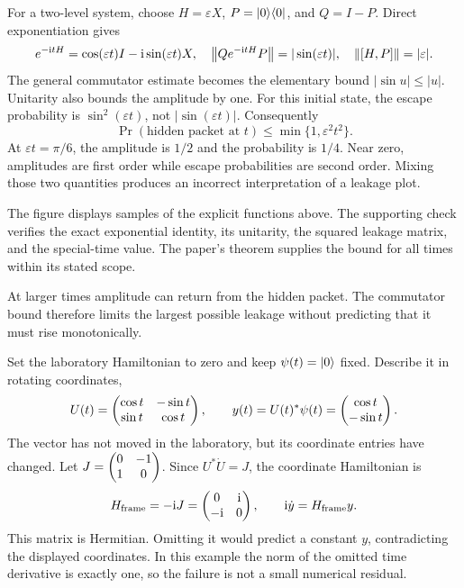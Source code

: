 For a two-level system, choose $H=\varepsilon X$, $P=\lvert 0\rangle\langle 0\rvert$, and $Q=I-P$. Direct exponentiation gives
\[
e^{-\mathrm i tH}=\cos(\varepsilon t)I-\mathrm i\sin(\varepsilon t)X,
\quad
\left\lVert Qe^{-\mathrm i tH}P\right\rVert=|\sin(\varepsilon t)|,
\quad\left\lVert[H,P]\right\rVert=|\varepsilon|.
\]
The general commutator estimate becomes the elementary bound $|\sin u|\le |u|$. Unitarity also bounds the amplitude by one.
For this initial state, the escape probability is $\sin^2(\varepsilon t)$, not $|\sin(\varepsilon t)|$. Consequently
\[
\Pr(\text{hidden packet at }t)\le\min\{1,\varepsilon^2t^2\}.
\]
At $\varepsilon t=\pi/6$, the amplitude is $1/2$ and the probability is $1/4$. Near zero, amplitudes are first order while escape probabilities are second order. Mixing those two quantities produces an incorrect interpretation of a leakage plot.

The figure displays samples of the explicit functions above. The supporting check verifies the exact exponential identity, its unitarity, the squared leakage matrix, and the special-time value. The paper's theorem supplies the bound for all times within its stated scope.

At larger times amplitude can return from the hidden packet. The commutator bound therefore limits the largest possible leakage without predicting that it must rise monotonically.

Set the laboratory Hamiltonian to zero and keep $\psi(t)=\lvert 0\rangle$ fixed. Describe it in rotating coordinates,
\[
U(t)=\begin{pmatrix}\cos t&-\sin t\\\sin t&\cos t\end{pmatrix},
\qquad y(t)=U(t)^*\psi(t)=\begin{pmatrix}\cos t\\-\sin t\end{pmatrix}.
\]
The vector has not moved in the laboratory, but its coordinate entries have changed.
Let $J=\begin{pmatrix}0&-1\\1&0\end{pmatrix}$. Since $U^*\dot U=J$, the coordinate Hamiltonian is
\[
H_{\rm frame}=-\mathrm i J=\begin{pmatrix}0&\mathrm i\\-\mathrm i&0\end{pmatrix},
\qquad \mathrm i\dot y=H_{\rm frame}y.
\]
This matrix is Hermitian. Omitting it would predict a constant $y$, contradicting the displayed coordinates. In this example the norm of the omitted time derivative is exactly one, so the failure is not a small numerical residual.

